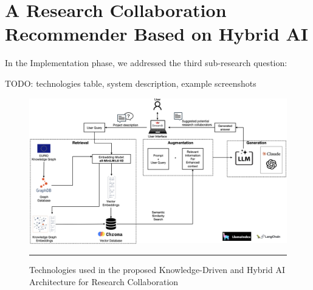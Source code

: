 \chapter{A Research Collaboration Recommender Based on Hybrid AI}\label{chap:ArtifactDevelopment}

In the Implementation phase, we addressed the third sub-research question:
\begin{center}
    \rqThree
\end{center}

TODO: technologies table, system description, example screenshots

\begin{figure}[htbp]
    \centering
 \includegraphics[width=\textwidth]{figures/implementation/proposed-system-graphRAG-technologies.png}
     \rule{35em}{0.5pt}
    \caption{Technologies used in the proposed Knowledge-Driven and Hybrid AI Architecture for Research Collaboration}
 \label{fig:proposed-system-graphRAG-technologies}
\end{figure}